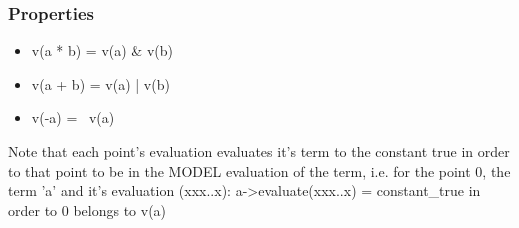 \documentclass{article}
\begin{document}
				\subsubsection*{Properties}
				\begin{itemize}
					\item v(a * b) = v(a) \& v(b)
					\item v(a + b) = v(a) | v(b)
					\item v(-a) = ~v(a)
				\end{itemize}

				Note that each point's evaluation evaluates it's term to the constant true in order to that point to be
				in the MODEL evaluation of the term, i.e. for the point 0, 
				the term 'a' and it's evaluation (xxx..x): a->evaluate(xxx..x) = constant\_true 
				in order to 0 belongs to v(a)
				\newline
			
\end{document}
